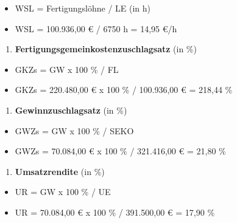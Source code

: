 \begin{itemize}
\item
  WSL = Fertigungslöhne / LE (in h)
\item
  WSL = 100.936,00 € / 6750 h = 14,95 €/h
\end{itemize}

\begin{enumerate}
\def\labelenumi{\alph{enumi})}
\setcounter{enumi}{2}
\item
  \textbf{Fertigungsgemeinkostenzuschlagsatz} (in \%)
\end{enumerate}

\begin{itemize}
\item
  GKZs = GW x 100 \% / FL
\item
  GKZs = 220.480,00 € x 100 \% / 100.936,00 € = 218,44 \%
\end{itemize}

\begin{enumerate}
\def\labelenumi{\alph{enumi})}
\setcounter{enumi}{3}
\item
  \textbf{Gewinnzuschlagsatz} (in \%)
\end{enumerate}

\begin{itemize}
\item
  GWZs = GW x 100 \% / SEKO
\item
  GWZs = 70.084,00 € x 100 \% / 321.416,00 € = 21,80 \%
\end{itemize}

\begin{enumerate}
\def\labelenumi{\alph{enumi})}
\setcounter{enumi}{4}
\item
  \textbf{Umsatzrendite} (in \%)
\end{enumerate}

\begin{itemize}
\item
  UR = GW x 100 \% / UE
\item
  UR = 70.084,00 € x 100 \% / 391.500,00 € = 17,90 \%
\end{itemize}
